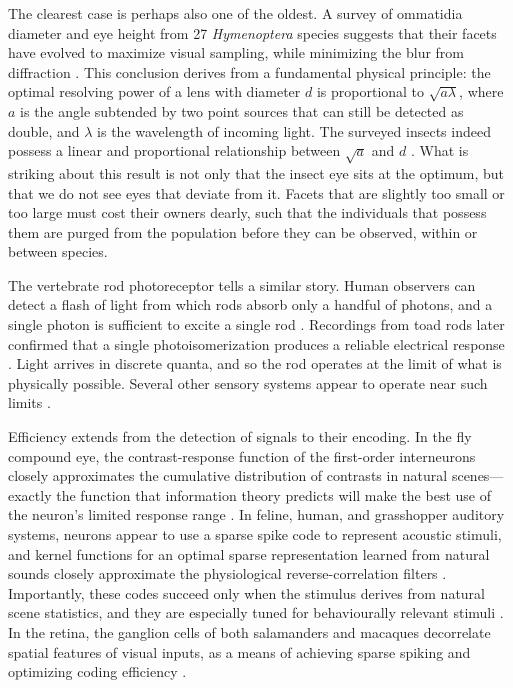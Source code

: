 \documentclass[twocolumn]{article}
\begin{document}
The clearest case is perhaps also one of the oldest. A survey of ommatidia diameter and eye height from 27 \textit{Hymenoptera} species suggests that their facets have evolved to maximize visual sampling, while minimizing the blur from diffraction \cite{barlow_1952}. This conclusion derives from a fundamental physical principle: the optimal resolving power of a lens with diameter $d$ is proportional to $\sqrt{a\lambda}$, where $a$ is the angle subtended by two point sources that can still be detected as double, and $\lambda$ is the wavelength of incoming light. The surveyed insects indeed possess a linear and proportional relationship between $\sqrt{a}$ and $d$ \cite{barlow_1952}. What is striking about this result is not only that the insect eye sits at the optimum, but that we do not see eyes that deviate from it. Facets that are slightly too small or too large must cost their owners dearly, such that the individuals that possess them are purged from the population before they can be observed, within or between species.

The vertebrate rod photoreceptor tells a similar story. Human observers can detect a flash of light from which rods absorb only a handful of photons, and a single photon is sufficient to excite a single rod \cite{Hecht_Shlaer_1942}. Recordings from toad rods later confirmed that a single photoisomerization produces a reliable electrical response \cite{Baylor_Lamb_1979, Rieke_Baylor_1998}. Light arrives in discrete quanta, and so the rod operates at the limit of what is physically possible. Several other sensory systems appear to operate near such limits \cite{Bialek_1987}.

Efficiency extends from the detection of signals to their encoding. In the fly compound eye, the contrast-response function of the first-order interneurons closely approximates the cumulative distribution of contrasts in natural scenes---exactly the function that information theory predicts will make the best use of the neuron's limited response range \cite{Laughlin_1981}. In feline, human, and grasshopper auditory systems, neurons appear to use a sparse spike code to represent acoustic stimuli, and kernel functions for an optimal sparse representation learned from natural sounds closely approximate the physiological reverse-correlation filters \cite{Machens_Gollisch_Kolesnikova_Herz_2005, smith_lewicki_2006}. Importantly, these codes succeed only when the stimulus derives from natural scene statistics, and they are especially tuned for behaviourally relevant stimuli \cite{Machens_Gollisch_Kolesnikova_Herz_2005, machens_herz_2001}. In the retina, the ganglion cells of both salamanders and macaques decorrelate spatial features of visual inputs, as a means of achieving sparse spiking and optimizing coding efficiency \cite{Pitkow_Meister_2012}.
\end{document}
